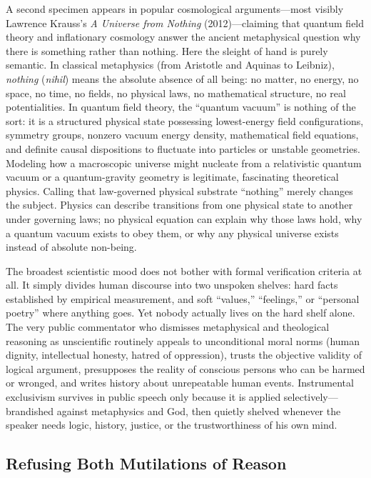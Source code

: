 A second specimen appears in popular cosmological arguments---most visibly Lawrence Krauss's \emph{A Universe from Nothing} (2012)---claiming that quantum field theory and inflationary cosmology answer the ancient metaphysical question why there is something rather than nothing. Here the sleight of hand is purely semantic. In classical metaphysics (from Aristotle and Aquinas to Leibniz), \emph{nothing} (\emph{nihil}) means the absolute absence of all being: no matter, no energy, no space, no time, no fields, no physical laws, no mathematical structure, no real potentialities. In quantum field theory, the ``quantum vacuum'' is nothing of the sort: it is a structured physical state possessing lowest-energy field configurations, symmetry groups, nonzero vacuum energy density, mathematical field equations, and definite causal dispositions to fluctuate into particles or unstable geometries. Modeling how a macroscopic universe might nucleate from a relativistic quantum vacuum or a quantum-gravity geometry is legitimate, fascinating theoretical physics. Calling that law-governed physical substrate ``nothing'' merely changes the subject. Physics can describe transitions from one physical state to another under governing laws; no physical equation can explain why those laws hold, why a quantum vacuum exists to obey them, or why any physical universe exists instead of absolute non-being.

The broadest scientistic mood does not bother with formal verification criteria at all. It simply divides human discourse into two unspoken shelves: hard facts established by empirical measurement, and soft ``values,'' ``feelings,'' or ``personal poetry'' where anything goes. Yet nobody actually lives on the hard shelf alone. The very public commentator who dismisses metaphysical and theological reasoning as unscientific routinely appeals to unconditional moral norms (human dignity, intellectual honesty, hatred of oppression), trusts the objective validity of logical argument, presupposes the reality of conscious persons who can be harmed or wronged, and writes history about unrepeatable human events. Instrumental exclusivism survives in public speech only because it is applied selectively---brandished against metaphysics and God, then quietly shelved whenever the speaker needs logic, history, justice, or the trustworthiness of his own mind.

\subsection{Refusing Both Mutilations of Reason}

